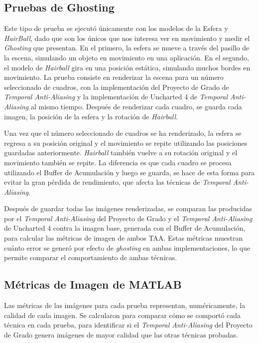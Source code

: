 \documentclass[pregrado]{tesis-usb} %
\begin{document}
\subsection{Pruebas de Ghosting}
Este tipo de prueba se ejecutó únicamente con los modelos de la Esfera y \textit{HairBall}, dado que son los únicos que nos interesa ver en movimiento y medir el \textit{Ghosting} que presentan. En el primero, la esfera se mueve a través del pasillo de la escena, simulando un objeto en movimiento en una aplicación. En el segundo, el modelo de \textit{Hairball} gira en una posición estática, simulando muchos bordes en movimiento. La prueba consiste en renderizar la escena para un número seleccionado de cuadros, con la implementación del Proyecto de Grado de \textit{Temporal Anti-Aliasing} y la implementación de Uncharted 4 de \textit{Temporal Anti-Aliasing} al mismo tiempo. Después de renderizar cada cuadro, se guarda cada imagen, la posición de la esfera y la rotación de \textit{Hairball}.

Una vez que el número seleccionado de cuadros se ha renderizado, la esfera se regresa a su posición original y el movimiento se repite utilizando las posiciones guardadas anteriormente. \textit{Hairball} también vuelve a su rotación original y el movimiento también se repite. La diferencia es que cada cuadro se procesa utilizando el Buffer de Acumulación y luego se guarda, se hace de esta forma para evitar la gran pérdida de rendimiento, que afecta las técnicas de \textit{Temporal Anti-Aliasing}.

Después de guardar todas las imágenes renderizadas, se comparan las producidas por el \textit{Temporal Anti-Aliasing} del Proyecto de Grado y el \textit{Temporal Anti-Aliasing} de Uncharted 4 contra la imagen base, generada con el Buffer de Acumulación, para calcular las métricas de imagen de ambos TAA. Estas métricas muestran cuánto error se generó por efecto de \textit{ghosting} en ambas implementaciones, lo que permite comparar el comportamiento de ambas técnicas. 


\subsection{Métricas de Imagen de MATLAB}
Las métricas de las imágenes para cada prueba representan, numéricamente, la calidad de cada imagen. Se calcularon para comparar cómo se comportó cada técnica en cada prueba, para identificar si el \textit{Temporal Anti-Aliasing} del Proyecto de Grado genera imágenes de mayor calidad que las otras técnicas probadas.
\end{document}
